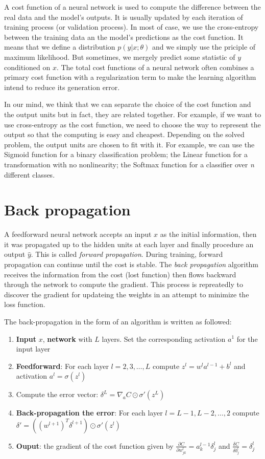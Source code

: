 A cost function of a neural network is used to compute the difference between the real data and the model's outputs. It is usually updated by each iteration of training process (or validation process). In most of case, we use the cross-entropy between the training data an the model's predictions as the cost function. It means that we define a distribution $p(y | x; \theta)$ and we simply use the priciple of maximum likelihood. But sometimes, we mergely predict some statistic of $y$ conditioned on $x$. The total cost functions of a neural network often combines a primary cost function with a regularization term to make the learning algorithm intend to reduce its generation error.

In our mind, we think that we can separate the choice of the cost function and the output units but in fact, they are related together. For example, if we want to use cross-entropy as the cost function, we need to choose the way to represent the output so that the computing is easy and cheapest. Depending on the solved problem, the output units are chosen to fit with it. For example, we can use the Sigmoid function for a binary classification problem; the Linear function for a transformation with no nonlinearity; the Softmax function for a classifier over \textit{n} different classes.
\section{Back propagation}
A feedforward neural network accepts an input \textbf{$x$} as the initial information, then it was propagated up to the hidden units at each layer and finally procedure an output \textbf{$\hat{y}$}. This is called \textit{forward propagation}. During training, forward propagation can continue until the cost is stable. The \textit{back propagation} algorithm receives the information from the cost (lost function) then flows backward through the network to compute the gradient. This process is repreatedly to discover the gradient for updateing the weights in an attempt to minimize the loss function.

The back-propagation in the form of an algorithm is written as followed:
\begin{enumerate}
	\item \textbf{Input} $x$, \textbf{network} with $L$ layers. Set the corresponding activation $a^1$ for the input layer
	\item \textbf{Feedforward}: For each layer $l = 2, 3, \ldots, L $ compute $z^l = w^la^{l-1} + b^l$ and activation $a^l = \sigma(z^l)$
	\item Compute the error vector: $\delta^L = \nabla_{a}C \odot \sigma'(z^L)$
	\item \textbf{Back-propagation the error}: For each layer $l = L-1, L-2,\ldots, 2$ compute $\delta' = ((w^{l+1})^T \delta^{l+1}) \odot \sigma'(z^l)$
	\item \textbf{Ouput}: the gradient of the cost function given by $\frac{\partial C}{\partial w^l_{jk}} = a^{l-1}_k \delta^l_j$ and $\frac{\delta C}{\delta b^l_j} = \delta^l_j$
\end{enumerate}


